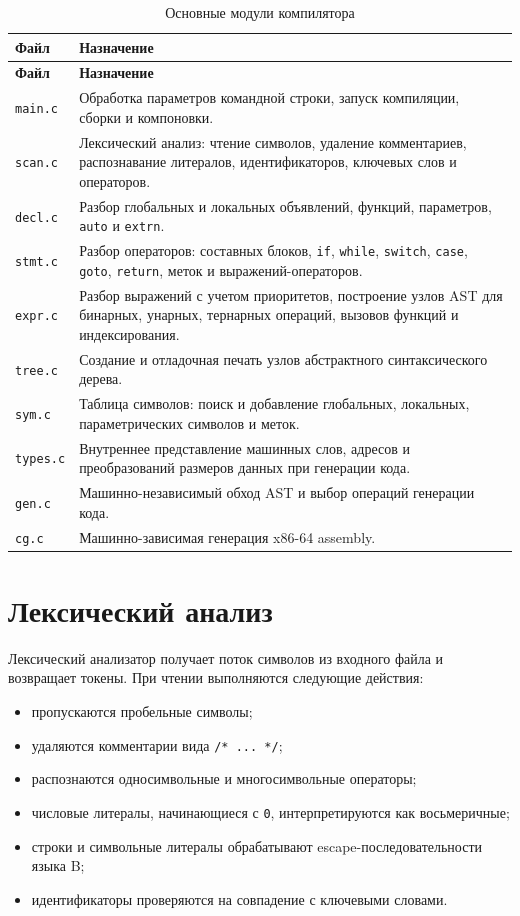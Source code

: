 \begin{longtable}{|p{4cm}|p{12cm}|}
  \caption{Основные модули компилятора}
  \label{tbl:modules} \\
  \hline
  \textbf{Файл} & \textbf{Назначение} \\
  \hline
  \endfirsthead
  \hline
  \textbf{Файл} & \textbf{Назначение} \\
  \hline
  \endhead
  \texttt{main.c} & Обработка параметров командной строки, запуск компиляции, сборки и компоновки. \\
  \hline
  \texttt{scan.c} & Лексический анализ: чтение символов, удаление комментариев, распознавание литералов, идентификаторов, ключевых слов и операторов. \\
  \hline
  \texttt{decl.c} & Разбор глобальных и локальных объявлений, функций, параметров, \texttt{auto} и \texttt{extrn}. \\
  \hline
  \texttt{stmt.c} & Разбор операторов: составных блоков, \texttt{if}, \texttt{while}, \texttt{switch}, \texttt{case}, \texttt{goto}, \texttt{return}, меток и выражений-операторов. \\
  \hline
  \texttt{expr.c} & Разбор выражений с учетом приоритетов, построение узлов AST для бинарных, унарных, тернарных операций, вызовов функций и индексирования. \\
  \hline
  \texttt{tree.c} & Создание и отладочная печать узлов абстрактного синтаксического дерева. \\
  \hline
  \texttt{sym.c} & Таблица символов: поиск и добавление глобальных, локальных, параметрических символов и меток. \\
  \hline
  \texttt{types.c} & Внутреннее представление машинных слов, адресов и преобразований размеров данных при генерации кода. \\
  \hline
  \texttt{gen.c} & Машинно-независимый обход AST и выбор операций генерации кода. \\
  \hline
  \texttt{cg.c} & Машинно-зависимая генерация x86-64 assembly. \\
  \hline
\end{longtable}

\section{Лексический анализ}

Лексический анализатор получает поток символов из входного файла и возвращает токены. При чтении выполняются следующие действия:

\begin{itemize}
  \item пропускаются пробельные символы;
  \item удаляются комментарии вида \texttt{/* ... */};
  \item распознаются односимвольные и многосимвольные операторы;
  \item числовые литералы, начинающиеся с \texttt{0}, интерпретируются как восьмеричные;
  \item строки и символьные литералы обрабатывают escape-последовательности языка B;
  \item идентификаторы проверяются на совпадение с ключевыми словами.
\end{itemize}

